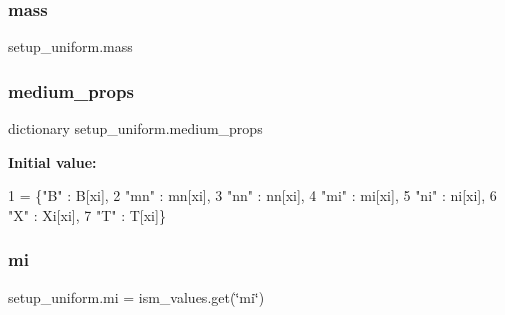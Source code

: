 \mbox{\label{namespacesetup__uniform_a2db1a2f1ef1aa768c4139e69fe939576}} 
\subsubsection{\texorpdfstring{mass}{mass}}
{\footnotesize\ttfamily setup\+\_\+uniform.\+mass}

\mbox{\label{namespacesetup__uniform_a6a62389e8939c4554c6586d01c601071}} 
\subsubsection{\texorpdfstring{medium\+\_\+props}{medium\_props}}
{\footnotesize\ttfamily dictionary setup\+\_\+uniform.\+medium\+\_\+props}

{\bfseries Initial value\+:}
\begin{DoxyCode}
1 =  \{\textcolor{stringliteral}{"B"}  : B[xi], 
2                             \textcolor{stringliteral}{"mn"} : mn[xi],
3                             \textcolor{stringliteral}{"nn"} : nn[xi],
4                             \textcolor{stringliteral}{"mi"} : mi[xi],
5                             \textcolor{stringliteral}{"ni"} : ni[xi],
6                             \textcolor{stringliteral}{"X"}  : Xi[xi],
7                             \textcolor{stringliteral}{"T"}  : T[xi]\}
\end{DoxyCode}
\mbox{\label{namespacesetup__uniform_ae0001eb2b7c03035364d8fc7e5e0191c}} 
\subsubsection{\texorpdfstring{mi}{mi}}
{\footnotesize\ttfamily setup\+\_\+uniform.\+mi = ism\+\_\+values.\+get(\char`\"{}mi\char`\"{})}

\mbox{\label{namespacesetup__uniform_a139c1a50093f83bbf927cc9640008ae3}} 
